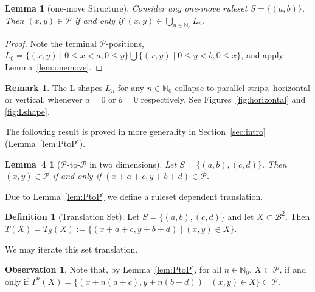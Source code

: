 \documentclass{amsart}
\theoremstyle{plain}
\newtheorem{lem}[thm]{Lemma}
\newtheorem*{lem*}{Lemma~4}
\theoremstyle{definition}
\newtheorem{defi}[thm]{Definition}
\newtheorem{rem}[thm]{Remark}
\newtheorem{obs}[thm]{Observation}
\renewcommand{\P}{\ensuremath{\mathcal P}}
\newcommand{\B}{\mathcal B}
\newcommand{\nz}{\mathbb N_0}
\renewcommand{\le}{\leqslant}
\newcommand{\In}[1]{\textcolor{blue}{#1}}
\begin{document}
\begin{lem}[{\sc one-move} Structure]\label{lem:onemovestruct} 
  Consider any {\sc one-move} ruleset $S= \{(a,b)\}$. 
    Then $(x,y)\in \P$ if and only if  $(x,y) \in \bigcup_{n\in \nz}  L_n$. 
\end{lem}
 \begin{proof}
     Note the terminal \P-positions, $L_0 =   \{(x,y)\mid    0 \le x< a,  0\le y   \} \bigcup \{(x, y )\mid    0 \le y< b , 0\le x  \}$, and apply Lemma~\ref{lem:onemove}.
 \end{proof}
 \begin{rem}
The L-shapes $L_n$ for any $n \in \nz$ collapse to parallel strips, horizontal or vertical, whenever $a=0$ or $b=0$ respectively. See Figures~\ref{fig:horizontal} and \ref{fig:Lshape}. 
 \end{rem}




The following result is proved in more generality in Section~\ref{sec:intro}  (Lemma~\ref{lem:PtoP}).
 \begin{lem*}[$\P$-to-$\P$ in two dimensions]
Let $S= \{ (a,b), (c,d)\}$.  Then $(x,y) \in \P$  if and only if   $(x+a+c,  y+b+d)\in  \P$.

\end{lem*}


Due to Lemma~\ref{lem:PtoP} we define a ruleset dependent translation. 

 \begin{defi}[Translation Set]\label{def:PtoP} 
 Let $S=\{(a,b),(c,d)\}$ and let $X\subset \B^2$. Then $T(X)=T_S(X):=\{(x+a+c,y+b+d) \mid (x,y)\in X\}$.
 \end{defi}
 We may iterate this set translation.

\begin{obs}\label{obs:T}
Note that, by Lemma~\ref{lem:PtoP}, for all $n\in\nz$, $X\subset\P$, if and only if $T^n(X)=\{(x+n(a+c), y+n(b+d)) \mid (x,y)\in X\}\subset \P$.
\end{obs}

\end{document}
